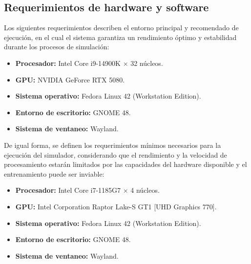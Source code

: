 \subsection{Requerimientos de hardware y software}

Los siguientes requerimientos describen el entorno principal y recomendado de ejecución, en el cual el sistema garantiza un rendimiento óptimo y estabilidad durante los procesos de simulación:

\begin{itemize}
	\item \textbf{Procesador:} Intel Core i9-14900K × 32 núcleos.
	\item \textbf{GPU:} NVIDIA GeForce RTX 5080.
	\item \textbf{Sistema operativo:} Fedora Linux 42 (Workstation Edition).
	\item \textbf{Entorno de escritorio:} GNOME 48.
	\item \textbf{Sistema de ventaneo:} Wayland.
\end{itemize}

De igual forma, se definen los requerimientos mínimos necesarios para la ejecución del simulador, considerando que el rendimiento y la velocidad de procesamiento estarán limitados por las capacidades del hardware disponible y el entrenamiento puede ser inviable:

\begin{itemize}
	\item \textbf{Procesador:} Intel Core i7-1185G7 × 4 núcleos.
	\item \textbf{GPU:} Intel Corporation Raptor Lake-S GT1 [UHD Graphics 770].
	\item \textbf{Sistema operativo:} Fedora Linux 42 (Workstation Edition).
	\item \textbf{Entorno de escritorio:} GNOME 48.
	\item \textbf{Sistema de ventaneo:} Wayland.
\end{itemize}
